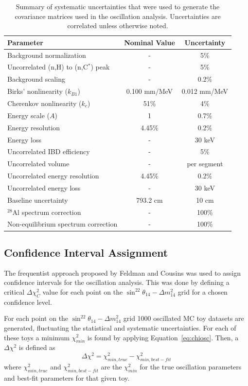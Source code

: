 \begin{table}[H]
\centering
\begin{tabular}{lcc}
	\hline 
	\textbf{Parameter} & \textbf{Nominal Value} & \textbf{Uncertainty} \\ 
	\hline 
	Background normalization  & - & 5\% \\ 
	Uncorrelated (n,H) to (n,C$^*$) peak & - & 5\% \\ 
	Background scaling & - & 0.2\% \\ 
	\hline 
	Birks' nonlinearity ($k_{B1}$) & 0.100 mm/MeV & 0.012 mm/MeV \\ 
	Cherenkov nonlinearity ($k_c$) & 51\% & 4\% \\ 
	Energy scale ($A$) & 1 & 0.7\% \\ 
	Energy resolution & 4.45\% & 0.2\% \\ 
	Energy loss & - & 30 keV \\ 
	Uncorrelated IBD efficiency & - & 5\% \\ 
	Uncorrelated volume & - & per segment \\ 
	Uncorrelated energy resolution & 4.45\% & 0.2\% \\ 
	Uncorrelated energy loss  & - & 30 keV \\ 
	Baseline uncertainty & 793.2 cm & 10 cm \\ 
	\hline 
	$^{28}$Al spectrum correction & - & 100\% \\ 
	Non-equilibrium spectrum correction & - & 100\% \\ 
	\hline 
\end{tabular} 
\caption{Summary of systematic uncertainties that were used to generate the covariance matrices used in the oscillation analysis. Uncertainties are correlated unless otherwise noted.}
\label{tab:sysunc}
\end{table}

\subsection{Confidence Interval Assignment}

The frequentist approach proposed by Feldman and Cousins \cite{PhysRevD.57.3873} was used to assign confidence intervals for the oscillation analysis.
This was done by defining a critical $\Delta\chi^2_C$ value for each point on the $\sin^22\theta_{14}-\Delta m^2_{14}$ grid for a chosen confidence level.

For each point on the $\sin^22\theta_{14}-\Delta m^2_{14}$ grid 1000 oscillated MC toy datasets are generated, fluctuating the statistical and systematic uncertainties.
For each of these toys a minimum $\chi^2_{min}$ is found by applying Equation~\ref{eq:chiosc}.
Then, a $\Delta\chi^2$ is defined as
\begin{equation}
	\Delta\chi^2 = \chi^2_{min,true} - \chi^2_{min,best-fit}
\end{equation}
where $\chi^2_{min,true}$ and $\chi^2_{min,best-fit}$ are the $\chi^2_{min}$ for the true oscillation parameters and best-fit parameters for that given toy.

